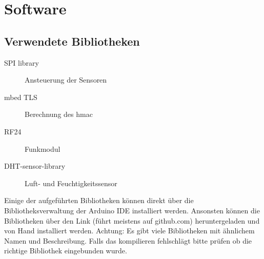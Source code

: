 \documentclass[
  12pt, %
  a4paper, %
  twoside, %
  openany, %
  numbers=noenddot, %
  BCOR=5mm, %
  parskip=half*, %
  thesis, %
]{bfhbook}
\begin{document}
 \section{Software}
 \subsection{Verwendete Bibliotheken}

  \begin{description}
\item[SPI library] Ansteuerung der Sensoren \cite{spi}
\item[mbed TLS] Berechnung des \Gls{hmac} \cite{mbedTLS}
\item[RF24] Funkmodul \cite{nrf24}
\item[DHT-sensor-library] Luft- und Feuchtigkeitssensor \cite{dht}
 \end{description}
Einige der aufgeführten Bibliotheken können direkt über die Bibliotheksverwaltung der Arduino IDE installiert werden. Ansonsten können die Bibliotheken über den Link (führt meistens auf github.com) heruntergeladen und von Hand installiert werden. 
{\color{red}Achtung: Es gibt viele Bibliotheken mit ähnlichem Namen und Beschreibung. Falls das kompilieren fehlschlägt bitte prüfen ob die richtige Bibliothek eingebunden wurde.}
\end{document}
